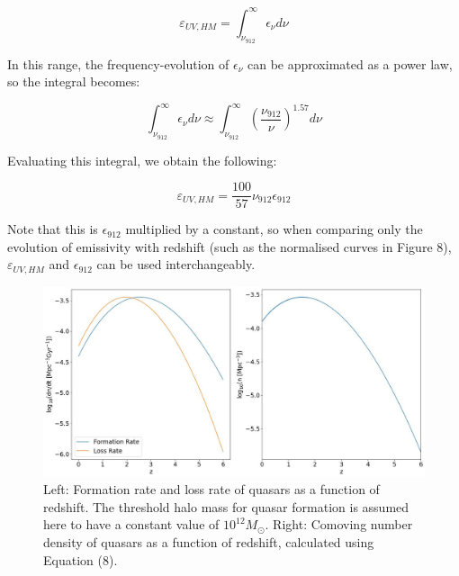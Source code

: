 \documentclass[12pt]{article}%
\begin{document}
\begin{equation}
    \varepsilon_{UV,HM}=\int_{\nu_{912}}^{\infty}\epsilon_\nu d\nu
\end{equation}

\noindent In this range, the frequency-evolution of $\epsilon_\nu$ can be approximated as a power law, so the integral becomes:

\begin{equation}
    \int_{\nu_{912}}^{\infty}\epsilon_\nu d\nu\approx\int_{\nu_{912}}^{\infty}\left(\frac{\nu_{912}}{\nu}\right)^{1.57}d\nu
\end{equation}

\noindent Evaluating this integral, we obtain the following:

\begin{equation}
    \varepsilon_{UV,HM}=\frac{100}{57}\nu_{912}\epsilon_{912}
\end{equation}

\noindent Note that this is $\epsilon_{912}$ multiplied by a constant, so when comparing only the evolution of emissivity with redshift (such as the normalised curves in Figure 8), $\varepsilon_{UV,HM}$ and $\epsilon_{912}$ can be used interchangeably.\par

\clearpage

\onecolumngrid


\begin{figure}[H]
\centering
\includegraphics[width=\linewidth]{Plot_7_2.jpeg}
\caption{Left: Formation rate and loss rate of quasars as a function of redshift. The threshold halo mass for quasar formation is assumed here to have a constant value of $10^{12}M_\odot$. Right: Comoving number density of quasars as a function of redshift, calculated using Equation (8).}
\label{fig:7}
\end{figure}
\end{document}
